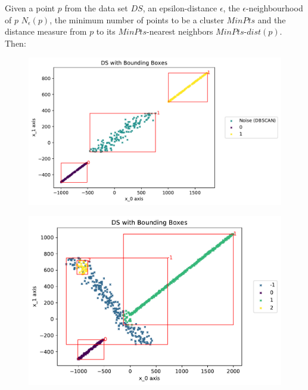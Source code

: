 Given a point $p$ from the data set $DS$, an epsilon-distance $\epsilon$, the  $\epsilon$-neighbourhood of $p$ $N_{\epsilon}(p)$, the minimum number of points to be a cluster $MinPts$ and the distance measure from $p$ to its $MinPts$-nearest neighbors $MinPts$-$dist(p)$. Then:
\begin{figure}
    \centering
    \begin{minipage}{.47\textwidth}
      \centering
      \includegraphics[width=.8\textwidth]{figures/DSwithDBSCANbadBoundingBoxes.pdf}
      \label{fig:baddbscan}
    \end{minipage}%
    \begin{minipage}{.53 \textwidth}
      \centering
      \includegraphics[width=.8\textwidth]{figures/DSwithOPTICSBoundingBoxes.pdf}
      \label{fig:goodoptics}
    \end{minipage}
\end{figure}


